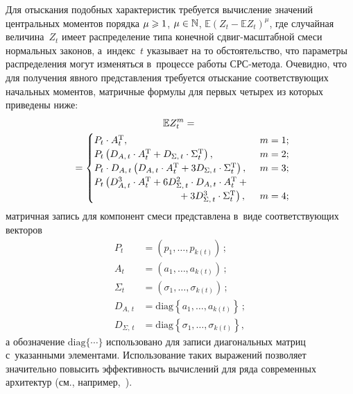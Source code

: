\begin{multicols}{2}
Для отыскания подобных характеристик требуется вычисление значений 
центральных моментов порядка $\mu\hm\geqslant 1$, $\mu\hm\in \mathbb{N}$,
$\mathbb{E} \left(Z_t-\mathbb{E} Z_t\right)^\mu$,
где случайная величина~$Z_t$ имеет распределение типа конечной сдвиг-мас\-штаб\-ной 
смеси нормальных законов, а~индекс~$t$ указывает на то обстоятельство, что 
параметры распределения могут изменяться в~процессе работы СРС-ме\-то\-да. 
Очевидно, что для получения явного представления требуется отыскание 
соответствующих начальных моментов, матричные формулы для первых четырех 
из которых приведены ниже:
\begin{multline*}
\mathbb{E} Z_t^m={}\\
{}=\begin{cases}
P_t\cdot A_t^{\mathrm{T}}, & m=1;\\
P_t\left(D_{A,\,t}\cdot A_t^{\mathrm{T}} + D_{\Sigma,\,t} \cdot \Sigma_t^{\mathrm{T}}\right), & m=2;\\
P_t\cdot D_{A,\,t}\left(D_{A,\,t}\cdot A_t^{\mathrm{T}}+3 D_{\Sigma,\,t}
\cdot\Sigma_t^{\mathrm{T}}\right), & m=3;\\
P_t\left( D_{A,\,t}^3\cdot A_t^{\mathrm{T}} +6 D_{\Sigma,\,t}^2\cdot D_{A,\,t}
\cdot A_t^{\mathrm{T}}+{}\right.&\\
\left.\hspace*{30mm}{}+3 D_{\Sigma,\,t}^3\cdot\Sigma_t^{\mathrm{T}}\right), & m=4;
\end{cases}\hspace*{-2.42pt}
\label{NonCentralZMatrix}
\end{multline*}
матричная запись для компонент смеси пред\-став\-ле\-на в~виде соответствующих векторов
\begin{align*}
P_t&=\left(p_1,\ldots,p_{k(t)}\right)\,;\\
A_t&=\left(a_1,\ldots,a_{k(t)}\right)\,;\\
\Sigma_t&=\left(\sigma_1,\ldots,\sigma_{k(t)}\right)\,; \\
D_{A,\,t}&=\mathrm{diag}\left\{a_1,\ldots,a_{k(t)}\right\}\,;\\
D_{\Sigma,\,t}&=\mathrm{diag}\left\{\sigma_1,\ldots,\sigma_{k(t)}\right\},
\end{align*}
а обозначение $\mathrm{diag}\{\cdots\}$ использовано для записи диагональных 
матриц с~указанными элементами. Использование таких выражений позволяет 
значительно повысить эффективность вычислений для ряда современных архитектур 
(см., например,~\cite{Gorshenin2015ICNAAM3}).


\end{multicols}
